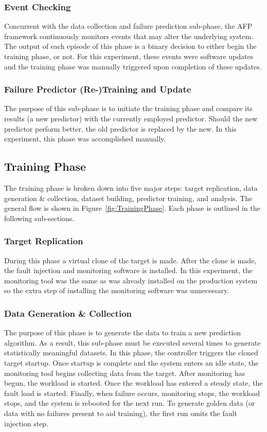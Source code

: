 \subsubsection{Event Checking}
Concurrent with the data collection and failure prediction sub-phase, the
\ac{AFP} framework continuously monitors events that may alter the underlying
system.  The output of each episode of this phase is a binary decision to
either begin the training phase, or not.  For this experiment, these events
were software updates and the training phase was manually triggered upon
completion of these updates.

\subsubsection{Failure Predictor (Re-)Training and Update}
The purpose of this sub-phase is to initiate the training phase and compare its
results (a new predictor) with the currently employed predictor.  Should the
new predictor perform better, the old predictor is replaced by the new.  In
this experiment, this phase was accomplished manually.

\subsection{Training Phase}
The training phase is broken down into five major steps:  target replication,
data generation \& collection, dataset building, predictor training, and
analysis.  The general flow is shown in Figure~\ref{fig:TrainingPhase}.  Each
phase is outlined in the following sub-sections.

\figTrainingPhase{4in}

\subsubsection{Target Replication}
During this phase a virtual clone of the target is made.  After the clone is
made, the fault injection and monitoring software is installed.  In this
experiment, the monitoring tool was the same as was already installed on the
production system so the extra step of installing the monitoring software was
unnecessary.

\subsubsection{Data Generation \& Collection}
The purpose of this phase is to generate the data to train a new prediction
algorithm.  As a result, this sub-phase must be executed several times to
generate statistically meaningful datasets.  In this phase, the controller
triggers the cloned target startup.  Once startup is complete and the system
enters an idle state, the monitoring tool begins collecting data from the
target.  After monitoring has begun, the workload is started.  Once the
workload has entered a steady state, the fault load is started.  Finally, when
failure occurs, monitoring stops, the workload stops, and the system is
rebooted for the next run.  To generate golden data (or data with no failures
present to aid training), the first run omits the fault injection step.

